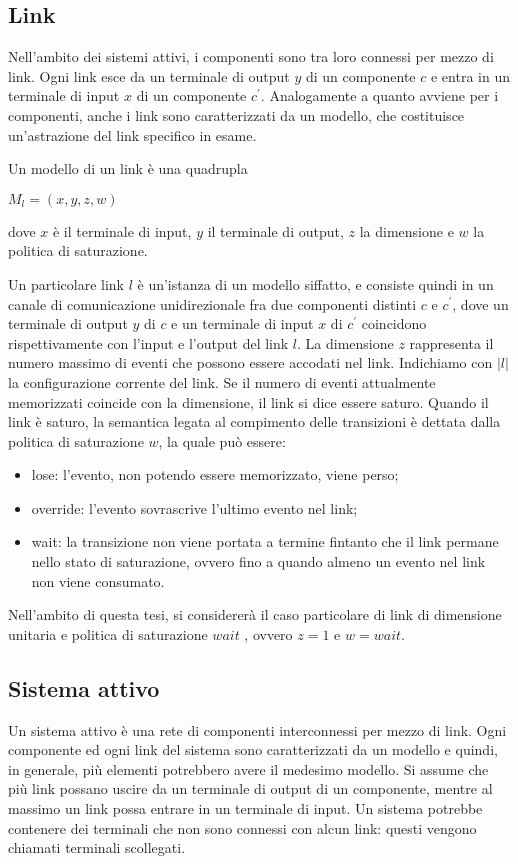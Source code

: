 \subsection{Link}
Nell'ambito dei sistemi attivi, i componenti sono tra loro connessi per mezzo di link. Ogni link esce da un terminale di output $y$ di un componente $c$ e entra in un terminale di input $x$ di un componente $c^\prime$.
Analogamente a quanto avviene per i componenti, anche i link sono caratterizzati da un modello, che costituisce un'astrazione del link specifico in esame.

\begin{defn}
Un modello di un link è una quadrupla
\begin{center}
	$M_l = (x,y,z,w)$
\end{center}
dove $x$ è il terminale di input, $y$ il terminale di output, $z$ la dimensione e $w$ la politica di saturazione.
\end{defn}
Un particolare link $l$ è un'istanza di un modello siffatto, e consiste quindi in un canale di comunicazione unidirezionale fra due componenti distinti $c$ e $c^\prime$, dove un terminale di output $y$ di $c$ e un terminale di input $x$ di $c^\prime$ coincidono rispettivamente con l'input e l'output del link $l$.
La dimensione $z$ rappresenta il numero massimo di eventi che possono essere accodati nel link. 
Indichiamo con $|l|$ la configurazione corrente del link. 
Se il numero di eventi attualmente memorizzati coincide con la dimensione, il link si dice essere saturo.
Quando il link è saturo, la semantica legata al compimento delle transizioni è dettata dalla politica di saturazione $w$, la quale può essere:
\begin{itemize}
\item lose: l'evento, non potendo essere memorizzato, viene perso;
\item override: l'evento sovrascrive l'ultimo evento nel link;
\item wait: la transizione non viene portata a termine fintanto che il link permane nello stato di saturazione, ovvero fino a quando almeno un evento nel link non viene consumato.
\label{saturation}
\end{itemize}
Nell'ambito di questa tesi, si considererà il caso particolare di link di dimensione unitaria e politica di saturazione $wait$ , ovvero $z = 1$ e $w = wait$.

\subsection{Sistema attivo}
Un sistema attivo è una rete di componenti interconnessi per mezzo di link. Ogni componente ed ogni link del sistema sono caratterizzati da un modello e quindi, in generale, più elementi potrebbero avere il medesimo modello. Si assume che più link possano uscire da un terminale di output di un componente, mentre al massimo un link possa entrare in un terminale di input.
Un sistema potrebbe contenere dei terminali che non sono connessi con alcun link: questi vengono chiamati terminali scollegati.

